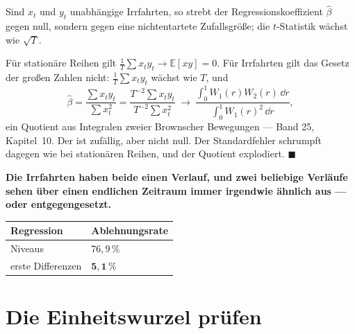 \begin{merksatz}
Sind $x_t$ und $y_t$ unabhängige Irrfahrten, so strebt der Regressionskoeffizient $\hat\beta$  gegen null, sondern gegen eine nichtentartete Zufallsgröße; die $t$-Statistik wächst wie $\sqrt T$.

Für stationäre Reihen gilt $\frac1T\sum x_ty_t \to \mathbb{E}[xy] = 0$. Für Irrfahrten gilt das Gesetz der großen Zahlen nicht: $\frac1T\sum x_ty_t$ wächst wie $T$, und
\[ \hat\beta = \frac{\sum x_ty_t}{\sum x_t^{2}} = \frac{T^{-2}\sum x_ty_t}{T^{-2}\sum x_t^{2}} \ \longrightarrow\ \frac{\int_0^1 W_1(r)W_2(r)\,\dd r}{\int_0^1 W_1(r)^{2}\,\dd r} , \]
ein Quotient aus Integralen zweier Brownscher Bewegungen --- Band 25, Kapitel~10. Der ist zufällig, aber nicht null. Der Standardfehler schrumpft dagegen wie bei stationären Reihen, und der Quotient explodiert. $\blacksquare$

\begin{center}
\begin{minipage}{0.9\textwidth}
\textbf{Die Irrfahrten haben beide einen Verlauf, und zwei beliebige Verläufe sehen über einen endlichen Zeitraum immer irgendwie ähnlich aus --- oder entgegengesetzt.}
\end{minipage}
\end{center}

\begin{center}
{\small
\renewcommand{\arraystretch}{1.48}
\begin{tabular}{@{}P{4.0cm}P{2.6cm}@{}}
\toprule
\textbf{Regression} & \textbf{Ablehnungsrate}\\
\midrule
Niveaus & $76{,}9\,\%$\\
erste Differenzen & $\mathbf{5{,}1\,\%}$\\
\bottomrule
\end{tabular}}
\end{center}
\end{merksatz}

\section{Die Einheitswurzel prüfen}

